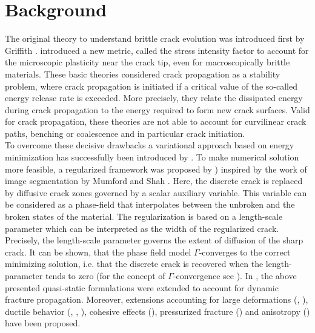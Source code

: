 \chapter{Background} 
The original theory to understand brittle crack evolution was introduced first by Griffith \cite{griffith1921}. \cite{Irwi1958elasticity} introduced a new metric, called the stress intensity factor to account for the microscopic plasticity near the crack tip, even for macroscopically brittle materials. These basic theories considered crack propagation as a stability problem, where crack propagation is initiated if a critical value of the so-called energy release rate is exceeded. More precisely, they relate the dissipated energy during crack propagation to the energy required to form new crack surfaces. Valid for crack propagation, these theories are not able to account for curvilinear crack paths, benching or coalescence and in particular crack initiation. \\
To overcome these decisive drawbacks a variational approach based on energy minimization has successfully been introduced by \cite{fran1998revisiting}. To make numerical solution more feasible, a regularized framework was proposed by \cite{bourd2000}) inspired by the work of image segmentation by Mumford and Shah \cite{mumf1989}. Here, the discrete crack is replaced by diffusive crack zones governed by a scalar auxiliary variable. This variable can be considered as a phase-field that interpolates between the unbroken and the broken states of the material. The regularization is based on a length-scale parameter which can be interpreted as the width of the regularized crack. Precisely, the length-scale parameter governs the extent of diffusion of the sharp crack. It can be shown, that the phase field model $\Gamma$-converges to the correct minimizing solution, i.e. that the discrete crack is recovered when the length-parameter tends to zero (for the concept of $\Gamma$-convergence see \cite{alberti2000variational}). In \cite{larsen2010existence}, \cite{bourdin2011time} the above presented quasi-static formulations were extended to account for dynamic fracture propagation. Moreover, extensions accounting for large deformations (\cite{miehe2014phase}, \cite{ambati2016phase}), ductile behavior (\cite{ambati2015phase}, \cite{alessi2015gradient}, \cite{borden2016phase}), cohesive effects (\cite{verhoosel2013phase}), pressurized fracture (\cite{wheeler2014augmented}) and anisotropy (\cite{li2015phase}) have been proposed. \\
